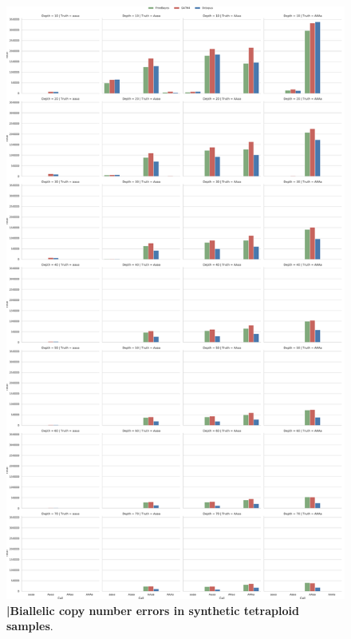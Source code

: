 \documentclass{article}
\begin{document}
\clearpage

\begin{figure}[ht!]
    \centering
    \includegraphics[height=0.95\textheight]{figures/tetraploid_biallelic_copy_errors}
    \caption{\textbf{|\:Biallelic copy number errors in synthetic tetraploid samples}.}
    \label{supfig:tetraploid_biallelic_copy_errors}
\end{figure}

\clearpage
\end{document}
